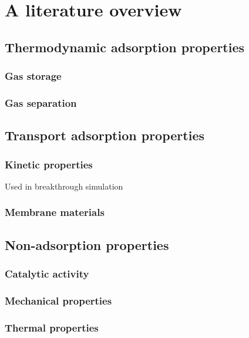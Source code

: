\documentclass[main.tex]{subfiles}
\begin{document}
\section{A literature overview}

\subsection{Thermodynamic adsorption properties}

\subsubsection{Gas storage}

\subsubsection{Gas separation}

\subsection{Transport adsorption properties}

\subsubsection{Kinetic properties}

Used in breakthrough simulation

\subsubsection{Membrane materials}

\subsection{Non-adsorption properties}

\subsubsection{Catalytic activity}

\subsubsection{Mechanical properties}

\subsubsection{Thermal properties}
\end{document}
